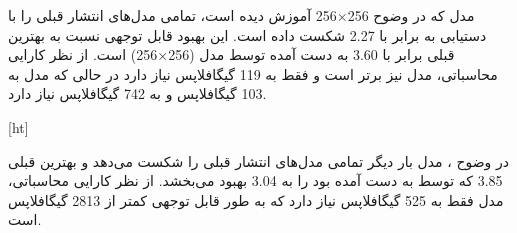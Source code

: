 مدل  که در وضوح 256×256 آموزش دیده است، تمامی مدل‌های انتشار قبلی را با دستیابی به  برابر با 2.27 شکست داده است. این بهبود قابل توجهی نسبت به بهترین  قبلی برابر با 3.60 به دست آمده توسط مدل  (256×256) است. از نظر کارایی محاسباتی، مدل  نیز برتر است و فقط به 119 گیگافلاپس نیاز دارد در حالی که مدل  به 103 گیگافلاپس و  به 742 گیگافلاپس نیاز دارد.

[ht]

در وضوح ، مدل  بار دیگر تمامی مدل‌های انتشار قبلی را شکست می‌دهد و بهترین  قبلی 3.85 که توسط  به دست آمده بود را به 3.04 بهبود می‌بخشد. از نظر کارایی محاسباتی، مدل  فقط به 525 گیگافلاپس نیاز دارد که به طور قابل توجهی کمتر از 2813 گیگافلاپس  است.